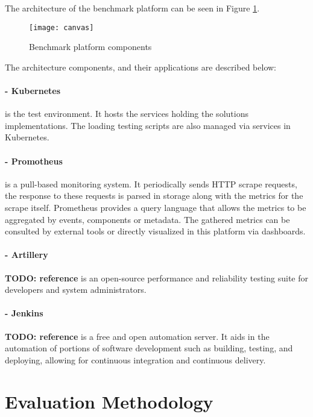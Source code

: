 The architecture of the benchmark platform can be seen in Figure \ref{fig:canvas}.

\begin{figure}[htbp]
    \centering
    \centerline{\texttt{[image: canvas]}}
    \caption{Benchmark platform components}
    \label{fig:canvas}
\end{figure}

\newpage

The architecture components, and their applications are described below:

\paragraph{- Kubernetes \cite{kubernetes}} is the test environment.
It hosts the services holding the solutions implementations.
The loading testing scripts are also managed via services in Kubernetes.

\paragraph{- Promotheus \cite{turnbull2018monitoring}} is a pull-based monitoring system.
It periodically sends HTTP scrape requests, the response to these requests is parsed in storage along with the metrics for the scrape itself.
Prometheus provides a query language that allows the metrics to be aggregated by events, components or metadata.
The gathered metrics can be consulted by external tools or directly visualized in this platform via dashboards.

\paragraph{- Artillery} \textbf{TODO: reference}
is an open-source performance and reliability testing suite for developers and system administrators.

\paragraph{- Jenkins} \textbf{TODO: reference}
is a free and open automation server.
It aids in the automation of portions of software development such as building, testing, and deploying, allowing for continuous integration and continuous delivery.

\section{Evaluation Methodology} %
\label{sec:evaluation_methodology}

